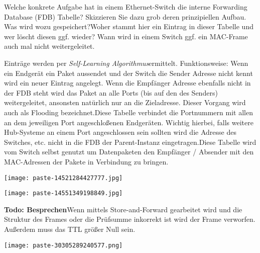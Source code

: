 \documentclass{article}
\begin{document}
\begin{tcolorbox}[colback=white!10!white,colframe=lightgray!75!black,
  savelowerto=\jobname_ex.tex,breakable,enhanced,lines before break=40]

\justifying
Welche konkrete Aufgabe hat in einem Ethernet-Switch die interne Forwarding Database (FDB) Tabelle? Skizzieren Sie dazu grob deren prinzipiellen Aufbau. Was wird wozu gespeichert?Woher stammt hier ein Eintrag in dieser Tabelle und wer löscht diesen ggf. wieder? Wann wird in einem Switch ggf. ein MAC-Frame auch mal nicht weitergeleitet.

\tcblower

\justifying
Einträge werden per \textit{Self-Learning Algorithmus}ermittelt. Funktionsweise: Wenn ein Endgerät ein Paket aussendet und der Switch die Sender Adresse nicht kennt wird ein neuer Eintrag angelegt. Wenn die Empfänger Adresse ebenfalls nicht in der FDB steht wird das Paket an alle Ports (bis auf den des Senders) weitergeleitet, ansonsten natürlich nur an die Zieladresse. Dieser Vorgang wird auch als Flooding bezeichnet.Diese Tabelle verbindet die Portnummern mit allen an dem jeweiligen Port angeschloßenen Endgeräten. Wichtig hierbei, falls weitere Hub-Systeme an einem Port angeschlossen sein sollten wird die Adresse des Switches, etc. nicht in die FDB der Parent-Instanz eingetragen.Diese Tabelle wird vom Switch selbst genutzt um Datenpaketen den Empfänger / Absender mit den MAC-Adressen der Pakete in Verbindung zu bringen.\begin{center}
\texttt{[image: paste-14521284427777.jpg]}
\end{center}
\begin{center}
\texttt{[image: paste-14551349198849.jpg]}
\end{center}
\textbf{Todo: Besprechen}Wenn mittels Store-and-Forward gearbeitet wird und die Struktur des Frames oder die Prüfsumme inkorrekt ist wird der Frame verworfen. Außerdem muss das TTL größer Null sein.\begin{center}
\texttt{[image: paste-30305289240577.png]}
\end{center}

\end{tcolorbox}
\end{document}
